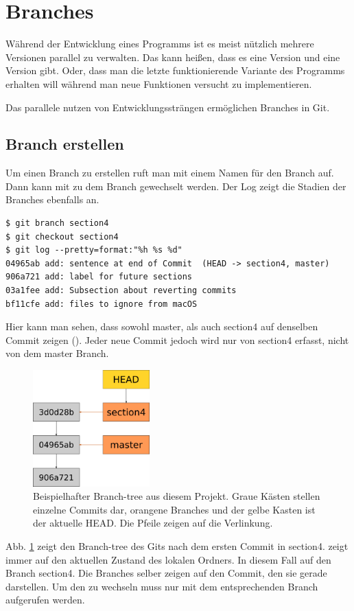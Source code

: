 \section{Branches}\label{sec:branch}
Während der Entwicklung eines Programms ist es meist nützlich mehrere Versionen parallel zu verwalten. Das kann heißen, dass es eine  Version und eine  Version gibt. Oder, dass man die letzte funktionierende Variante des Programms erhalten will während man neue Funktionen versucht zu implementieren.

Das parallele nutzen von Entwicklungssträngen ermöglichen Branches in Git.
\subsection{Branch erstellen}
Um einen Branch zu erstellen ruft man  mit einem Namen für den Branch auf. Dann kann mit  zu dem Branch gewechselt werden. Der Log zeigt die Stadien der Branches ebenfalls an.
\begin{lstlisting}
$ git branch section4
$ git checkout section4
$ git log --pretty=format:"%h %s %d"
04965ab add: sentence at end of Commit  (HEAD -> section4, master)
906a721 add: label for future sections 
03a1fee add: Subsection about reverting commits 
bf11cfe add: files to ignore from macOS 
\end{lstlisting}
Hier kann man sehen, dass sowohl master, als auch section4 auf denselben Commit zeigen (). Jeder neue Commit jedoch wird nur von section4 erfasst, nicht von dem master Branch.

\begin{figure}[!ht]
	\centering
	\includegraphics[width=0.4\textwidth]{Bilder/branching.png}
	\caption{Beispielhafter Branch-tree aus diesem Projekt. Graue Kästen stellen einzelne Commits dar, orangene Branches und der gelbe Kasten ist der aktuelle HEAD. Die Pfeile zeigen auf die Verlinkung.}
	\label{fig:branch_1}
\end{figure}
Abb. \ref{fig:branch_1} zeigt den Branch-tree des Gits nach dem ersten Commit in section4.  zeigt immer auf den aktuellen Zustand des lokalen Ordners. In diesem Fall auf den Branch section4. Die Branches selber zeigen auf den Commit, den sie gerade darstellen. Um den  zu wechseln muss nur  mit dem entsprechenden Branch aufgerufen werden.